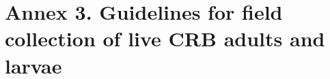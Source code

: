 \documentclass[twocolumn,letterpaper]{scrartcl}
\begin{document}
\section{Annex 3.  Guidelines for field collection of live CRB adults and larvae}
%
%
%
%
%
%
%
%
%
%
%
%
%
%
%
%
%
%
%
%
%
%
%
%
%
%
%
%
%
%
\end{document}
